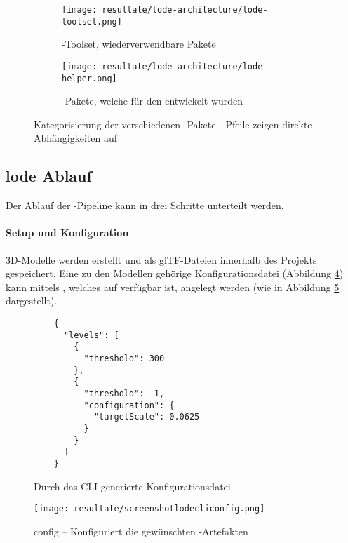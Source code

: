 \begin{figure}[H]
  \begin{subfigure}{.5\textwidth}
    \centering
    \texttt{[image: resultate/lode-architecture/lode-toolset.png]}
    \caption{-Toolset, wiederverwendbare Pakete}
    \label{fig:lodeToolset}
  \end{subfigure}%
  \begin{subfigure}{.5\textwidth}
    \centering
    \texttt{[image: resultate/lode-architecture/lode-helper.png]}
    \caption{-Pakete, welche für den  entwickelt wurden}
    \label{fig:lodeHelper}
  \end{subfigure}
  \caption{Kategorisierung der verschiedenen -Pakete - Pfeile zeigen direkte Abhängigkeiten auf}
  \label{fig:lodePackages}
\end{figure}

\subsection{lode Ablauf}

Der Ablauf der -Pipeline kann in drei Schritte unterteilt werden.

\paragraph{Setup und Konfiguration}
3D-Modelle werden erstellt und als glTF-Dateien innerhalb des Projekts gespeichert. Eine zu den Modellen gehörige Konfigurationsdatei (Abbildung \ref{fig:lodeConfigFile}) kann mittels , welches auf  verfügbar ist, angelegt werden (wie in Abbildung \ref{fig:lodecliconfig} dargestellt).

\begin{figure}[H]
  \begin{lstlisting}
    {
      "levels": [
        {
          "threshold": 300
        },
        {
          "threshold": -1,
          "configuration": {
            "targetScale": 0.0625
          }
        }
      ]
    }
  \end{lstlisting}
\caption{Durch das CLI generierte Konfigurationsdatei}
\label{fig:lodeConfigFile}
\end{figure}

\begin{figure}[H]
  \centering
  \texttt{[image: resultate/screenshotlodecliconfig.png]}
  \caption{ config – Konfiguriert die gewünschten -Artefakten}
  \label{fig:lodecliconfig}
\end{figure}

